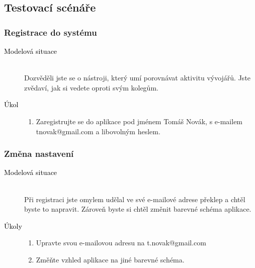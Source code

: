 \subsection{Testovací scénáře}

\subsubsection{Registrace do systému}
\begin{description}
    \item[\textcolor{black}{Modelová situace}] \hfill \\
        Dozvěděli jste se o nástroji, který umí porovnávat aktivitu vývojářů. Jste zvědaví, jak si vedete oproti svým kolegům.
    \item[\textcolor{black}{Úkol}] \hfill
        \vspace{-2mm}
        \begin{enumerate}
            \item Zaregistrujte se do aplikace pod jménem Tomáš Novák, s e-mailem \mbox{tnovak@gmail.com} a libovolným heslem.
        \end{enumerate}
\end{description}

\subsubsection{Změna nastavení}
\begin{description}
    \item[\textcolor{black}{Modelová situace}] \hfill \\
        Při registraci jste omylem udělal ve své e-mailové adrese překlep a chtěl byste to napravit. Zároveň byste si chtěl změnit barevné schéma aplikace.
    \item[\textcolor{black}{Úkoly}] \hfill
        \vspace{-2mm}
        \begin{enumerate}
            \item Upravte svou e-mailovou adresu na t.novak@gmail.com
            \item Změňte vzhled aplikace na jiné barevné schéma.
        \end{enumerate}
\end{description}

